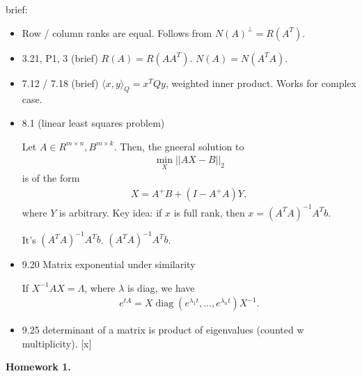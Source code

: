 \documentclass{article}
\DeclareMathOperator{\diag}{diag}
\begin{document}
brief:
\begin{itemize}
  \item Row / column ranks are equal.  Follows from $N(A)^{\perp} = R(A^T)$.
  \item 3.21, P1, 3 (brief) $R(A) = R(A A^T)$.  $N(A) = N(A^T A)$.

  \item 7.12 / 7.18 (brief) $\langle x, y\rangle_Q = x^T Q y$, weighted inner product.  Works for complex case.
  \item 8.1 (linear least squares problem)

    Let $A \in R^{m \times n}, B^{m \times k}$.  Then, the gneeral solution to
    \begin{align*}
      \min_{X} ||A X - B||_2
    \end{align*}
    is of the form
    \begin{align*}
      X = A^{+}B + (I - A^{+}A)Y,
    \end{align*}
    where $Y$ is arbitrary.  Key idea: if $x$ is full rank, then $x = (A^T A)^{-1} A^T b$.

    It's $(A^T A)^{-1}  A^T b$.  $(A^T A)^{-1} A^T b$.

  \item 9.20 Matrix exponential under similarity

    If $X^{-1}AX = \Lambda$, where $\lambda$ is diag, we have
    \begin{align*}
      e^{tA} = X \diag(e^{\lambda_1 t}, \dots, e^{\lambda_n t}) X^{-1}.
    \end{align*}

  \item 9.25 determinant of a matrix is product of eigenvalues (counted w multiplicity). [x]
\end{itemize}

{\bf Homework 1.}
\end{document}
